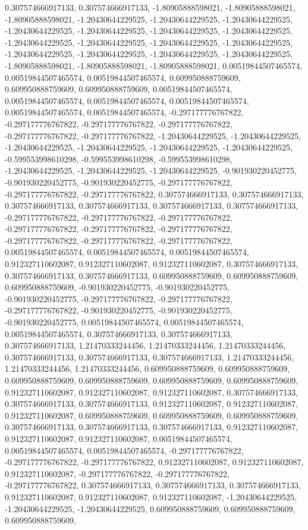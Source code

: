 \documentclass[
  ,man]{apa6}
\begin{document}
0.307574666917133, 0.307574666917133, -1.80905888598021, -1.80905888598021, -1.80905888598021, -1.20430644229525, -1.20430644229525, -1.20430644229525, -1.20430644229525, -1.20430644229525, -1.20430644229525, -1.20430644229525, -1.20430644229525, -1.20430644229525, -1.20430644229525, -1.20430644229525, -1.20430644229525, -1.20430644229525, -1.20430644229525, -1.20430644229525, -1.80905888598021, -1.80905888598021, -1.80905888598021, 0.00519844507465574, 0.00519844507465574, 0.00519844507465574, 0.609950888759609,
0.609950888759609, 0.609950888759609, 0.00519844507465574, 0.00519844507465574, 0.00519844507465574, 0.00519844507465574, 0.00519844507465574, 0.00519844507465574, -0.297177776767822, -0.297177776767822, -0.297177776767822, -0.297177776767822, -0.297177776767822, -0.297177776767822, -1.20430644229525, -1.20430644229525, -1.20430644229525, -1.20430644229525, -1.20430644229525, -1.20430644229525, -0.599553998610298, -0.599553998610298, -0.599553998610298, -1.20430644229525, -1.20430644229525, -1.20430644229525,
-0.901930220452775, -0.901930220452775, -0.901930220452775, -0.297177776767822, -0.297177776767822, -0.297177776767822, 0.307574666917133, 0.307574666917133, 0.307574666917133, 0.307574666917133, 0.307574666917133, 0.307574666917133, -0.297177776767822, -0.297177776767822, -0.297177776767822, -0.297177776767822, -0.297177776767822, -0.297177776767822, -0.297177776767822, -0.297177776767822, -0.297177776767822, 0.00519844507465574, 0.00519844507465574, 0.00519844507465574, 0.912327110602087, 0.912327110602087,
0.912327110602087, 0.307574666917133, 0.307574666917133, 0.307574666917133, 0.609950888759609, 0.609950888759609, 0.609950888759609, -0.901930220452775, -0.901930220452775, -0.901930220452775, -0.297177776767822, -0.297177776767822, -0.297177776767822, -0.901930220452775, -0.901930220452775, -0.901930220452775, 0.00519844507465574, 0.00519844507465574, 0.00519844507465574, 0.307574666917133, 0.307574666917133, 0.307574666917133, 1.21470333244456, 1.21470333244456, 1.21470333244456, 0.307574666917133,
0.307574666917133, 0.307574666917133, 1.21470333244456, 1.21470333244456, 1.21470333244456, 0.609950888759609, 0.609950888759609, 0.609950888759609, 0.609950888759609, 0.609950888759609, 0.609950888759609, 0.912327110602087, 0.912327110602087, 0.912327110602087, 0.307574666917133, 0.307574666917133, 0.307574666917133, 0.912327110602087, 0.912327110602087, 0.912327110602087, 0.609950888759609, 0.609950888759609, 0.609950888759609, 0.307574666917133, 0.307574666917133, 0.307574666917133, 0.912327110602087,
0.912327110602087, 0.912327110602087, 0.00519844507465574, 0.00519844507465574, 0.00519844507465574, -0.297177776767822, -0.297177776767822, -0.297177776767822, 0.912327110602087, 0.912327110602087, 0.912327110602087, -0.297177776767822, -0.297177776767822, -0.297177776767822, 0.307574666917133, 0.307574666917133, 0.307574666917133, 0.912327110602087, 0.912327110602087, 0.912327110602087, -1.20430644229525, -1.20430644229525, -1.20430644229525, 0.609950888759609, 0.609950888759609, 0.609950888759609,
\end{document}
